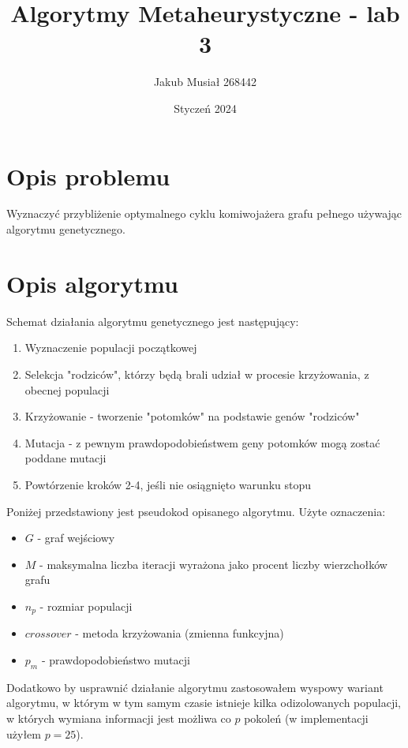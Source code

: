\documentclass[12pt]{article}
\title{Algorytmy Metaheurystyczne - lab 3}
\author{Jakub Musiał 268442}
\date{Styczeń 2024}
\begin{document}
\maketitle

\vspace*{2cm}

\section{Opis problemu}

Wyznaczyć przybliżenie optymalnego cyklu komiwojażera grafu pełnego używając algorytmu genetycznego.

\section*{Opis algorytmu}
    Schemat działania algorytmu genetycznego jest następujący:
    \begin{enumerate}
        \item Wyznaczenie populacji początkowej
        \item Selekcja "rodziców", którzy będą brali udział w procesie krzyżowania, z obecnej populacji
        \item Krzyżowanie - tworzenie "potomków" na podstawie genów "rodziców"
        \item Mutacja - z pewnym prawdopodobieństwem geny potomków mogą zostać poddane mutacji
        \item Powtórzenie kroków 2-4, jeśli nie osiągnięto warunku stopu
    \end{enumerate}

    \noindent\newline
    Poniżej przedstawiony jest pseudokod opisanego algorytmu.
    Użyte oznaczenia:
    \begin{itemize}
        \item $G$ - graf wejściowy
        \item $M$ - maksymalna liczba iteracji wyrażona jako procent liczby wierzchołków grafu
        \item $n_p$ - rozmiar populacji
        \item $crossover$ - metoda krzyżowania (zmienna funkcyjna)
        \item $p_m$ - prawdopodobieństwo mutacji
    \end{itemize}

    \noindent
    Dodatkowo by usprawnić działanie algorytmu zastosowałem wyspowy wariant algorytmu, w którym w tym samym czasie istnieje kilka odizolowanych populacji, w których wymiana informacji jest możliwa co $p$ pokoleń (w implementacji użyłem $p = 25$).
\end{document}
